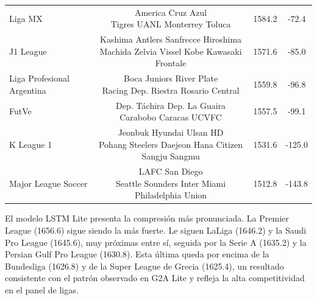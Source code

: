 \begin{table}[htbp]
{\begin{tabular}{l c c c}
		Liga MX & \makecell[l]{America Cruz Azul \\ Tigres UANL Monterrey Toluca} & 1584.2 & -72.4 \\
		J1 League & \makecell[l]{Kashima Antlers Sanfrecce Hiroshima \\ Machida Zelvia Vissel Kobe Kawasaki Frontale} & 1571.6 & -85.0 \\
		Liga Profesional Argentina & \makecell[l]{Boca Juniors River Plate \\ Racing Dep. Riestra Rosario Central} & 1559.8 & -96.8 \\
		FutVe & \makecell[l]{Dep. T\'achira Dep. La Guaira \\ Carabobo Caracas UCVFC} & 1557.5 & -99.1 \\
		K League 1 & \makecell[l]{Jeonbuk Hyundai Ulsan HD \\ Pohang Steelers Daejeon Hana Citizen Sangju Sangmu} & 1531.6 & -125.0 \\
		Major League Soccer & \makecell[l]{LAFC San Diego \\ Seattle Sounders Inter Miami Philadelphia Union} & 1512.8 & -143.8 \\
		\bottomrule
	\end{tabular}}%
\end{table}

El modelo LSTM Lite presenta la compresi\'on m\'as pronunciada. La Premier League (1656.6) sigue siendo la m\'as fuerte. Le siguen LaLiga (1646.2) y la Saudi Pro League (1645.6), muy pr\'oximas entre s\'i, seguida por la Serie A (1635.2) y la Persian Gulf Pro League (1630.8). Esta \'ultima queda por encima de la Bundesliga (1626.8) y de la Super League de Grecia (1625.4), un resultado consistente con el patr\'on observado en G2A Lite y refleja la alta competitividad en el panel de ligas.

\newpage

